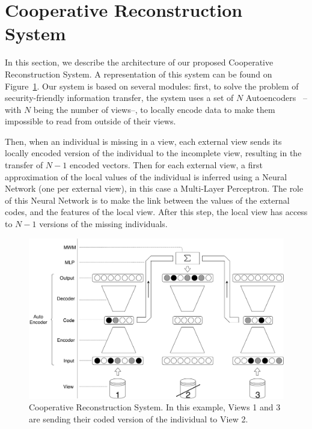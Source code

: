 	\section{Cooperative Reconstruction System}
\label{sec:crs}
	
In this section, we describe the architecture of our proposed Cooperative Reconstruction System. A representation of this system can be found on Figure~\ref{fig:base}. Our system is based on several modules: first, to solve the problem of security-friendly information transfer, the system uses a set of $N$ Autoencoders~\cite{hinton2006reducing} --with $N$ being the number of views--, to locally encode data to make them impossible to read from outside of their views.
	
Then, when an individual is missing in a view, each external view sends its locally encoded version of the individual to the incomplete view, resulting in the transfer of $N-1$ encoded vectors. Then for each external view, a first approximation of the local values of the individual is inferred using a Neural Network (one per external view), in this case a Multi-Layer Perceptron. The role of this Neural Network is to make the link between the values of the external codes, and the features of the local view. After this step, the local view has access to $N-1$ versions of the missing individuals.
	
	\begin{figure}[h]
		\centering
		\includegraphics[width=\textwidth]{img/base_system.pdf}
        \caption{Cooperative Reconstruction System. In this example, Views 1 and
        3 are sending their coded version of the individual to View 2.}
\label{fig:base}
	\end{figure}
	
